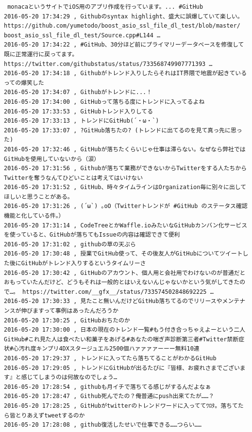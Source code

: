 \begin{verbatim}
 monacaというサイトでiOS用のアプリ作成を行っています。... #GitHub
2016-05-20 17:34:29 , Githubのsyntax highlight、盛大に誤爆していて楽しい。https://github.com/yumetodo/boost_asio_ssl_file_dl_test/blob/master/
boost_asio_ssl_file_dl_test/Source.cpp#L144 …
2016-05-20 17:34:22 , #GitHub、30分ほど前にプライマリーデータベースを修復して既に正常運行に戻ってます。https://twitter.com/githubstatus/status/733568749907771393 …
2016-05-20 17:34:18 , Githubがトレンド入りしたらそれはIT界隈で地震が起きているっての爆笑した
2016-05-20 17:34:07 , Githubがトレンドに...！
2016-05-20 17:34:00 , GitHubって落ちる度にトレンドに入ってるよね
2016-05-20 17:33:53 , GitHubトレンド入りしてる
2016-05-20 17:33:13 , トレンドにGitHub(´・ω・`)
2016-05-20 17:33:07 , ?GitHub落ちたの? (トレンドに出てるのを見て真っ先に思った)
2016-05-20 17:32:46 , GitHubが落ちたくらいじゃ仕事は滞らない。なぜなら弊社ではGitHubを使用していないから（涙）
2016-05-20 17:31:56 , Githubが落ちて業務ができないからTwitterをする人たちからTwitterを奪うなんてひどいことは考えてはいけない
2016-05-20 17:31:52 , GitHub、時々タイムラインはOrganization毎に別々に出してほしいと思うことがある。
2016-05-20 17:31:26 , (´ω`) ｡oO（Twitterトレンドが #GitHub のステータス確認機能と化している件。）
2016-05-20 17:31:14 , CodeTreeとかWaffle.ioみたいなGitHubカンバン化サービスを使っていると、GitHubが落ちてもIssueの内容は確認できて便利
2016-05-20 17:31:02 , githubの草の天ぷら
2016-05-20 17:30:48 , 授業でGitHub使って、その後友人がGitHubについてツイートした後にGitHubがトレンド入りするというタイムリーさ
2016-05-20 17:30:42 , GitHubのアカウント、個人用と会社用でわけないのが普通だとおもっていたんだけど、どうもそれは一般的とはいえないんじゃないかという気がしてきたので…。 https://twitter.com/__gfx__/status/733574502848692225 …
2016-05-20 17:30:33 , 見たこと無いんだけどGitHub落ちてるのでリリースやメンテナンスが伸びますって事例はあったんだろうか
2016-05-20 17:30:25 , GitHubおちたのか
2016-05-20 17:30:00 , 日本の現在のトレンド一覧#もう付き合っちゃえよーという二人GitHub#これ見た人は食べたい和菓子をあげる#あなたの喘ぎ声診断第三者#Twitter禁断症状#心汚れ度キンプリ4DXスタージュエル2500個ハァァァァーーー無料10連
2016-05-20 17:29:37 , トレンドに入ってたら落ちてることがわかるGitHub
2016-05-20 17:29:05 , トレンドにGitHubが出るたびに『皆様、お疲れさまでございます』と感じてしまうのは何故なのでしょう…
2016-05-20 17:28:54 , githubも月イチで落ちてる感じがするんだよなぁ
2016-05-20 17:28:47 , Github死んでたの？俺普通にpush出来てたが……？
2016-05-20 17:28:25 , GitHubがtwitterのトレンドワードに入っててﾜﾛﾀ。落ちてたら皆とりあえずtweetするのか
2016-05-20 17:28:08 , github復活したせいで仕事できる……つらい……

\end{verbatim}

